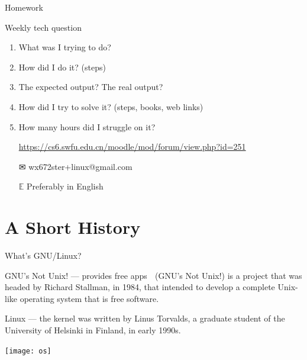 \begin{frame}{Homework}
  \begin{block}{Weekly tech question}
    \begin{enumerate}
    \item What was I trying to do?
    \item How did I do it? (steps)
    \item The expected output? The real output?
    \item How did I try to solve it? (steps, books, web links)
    \item How many hours did I struggle on it?
    \end{enumerate}
  \end{block}
  \begin{itemize}
  \item[\moodle]
    \url{https://cs6.swfu.edu.cn/moodle/mod/forum/view.php?id=251}
  \item[\Large\dejavu ✉] \alert{\ttfamily wx672ster+linux@gmail.com}
  \item[$\mathbb{E}$] Preferably in English
  \end{itemize}
\end{frame}

\section[History]{A Short History}

\begin{frame}{What's GNU/Linux?}
  \begin{minipage}{.6\textwidth}
    \begin{block}{GNU's Not Unix! --- provides free apps}
      {\Huge\nerd } (GNU's Not Unix!) is a project that was headed by Richard Stallman,
      in 1984, that intended to develop a complete Unix-like operating system that is free
      software.
    \end{block}
    \begin{block}{Linux --- the kernel}
      {\Huge\linux} was written by Linus Torvalds, a graduate student of the University of
      Helsinki in Finland, in early 1990s.
    \end{block}
  \end{minipage}\quad
  \begin{minipage}{.35\textwidth}
    \centering
    \texttt{[image: os]}
  \end{minipage}
\end{frame}

